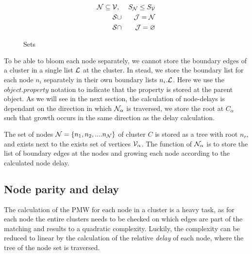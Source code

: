 \begin{eqnarray}\label{eq:upperboundsize}
  \mathcal{N} \subseteq \mathcal{V} &,& S_{\mathcal{N}} \leq S_{\mathcal{V}}  \\
  \nonumber \mathcal{S} &\cup& \mathcal{J} = \mathcal{N} \\
  \nonumber \mathcal{S} &\cap& \mathcal{J} = \varnothing
\end{eqnarray}


\begin{figure}
  \centering
  \caption{Sets}\label{fig:sets}
\end{figure}


To be able to bloom each node separately, we cannot store the boundary edges of a cluster in a single list $\mathcal{L}$ at the cluster. In stead, we store the boundary list for each node $n_i$ separately in their own boundary lists $n_i.\mathcal{L}$. Here we use the $object.property$ notation to indicate that the property is stored at the parent object. As we will see in the next section, the calculation of node-delays is dependant on the direction in which $\mathcal{N}_\alpha$ is traversed, we store the root at $C_\alpha$ such that growth occurs in the same direction as the delay calculation.

\begin{theorem}
  The set of nodes $\mathcal{N} = \{n_1, n_2, .... n_{\mathcal{N}}\}$ of cluster $C$ is stored as a tree with root $n_r$, and exists next to the exists set of vertices $\mathcal{V}_\alpha$. The function of $\mathcal{N}_\alpha$ is to store the list of boundary edges at the nodes and growing each node according to the calculated node delay.
\end{theorem}


\subsection{Node parity and delay}\label{sec:nodedelay}

The calculation of the PMW for each node in a cluster is a heavy task, as for each node the entire clusters needs to be checked on which edges are part of the matching and results to a quadratic complexity. Luckily, the complexity can be reduced to linear by the calculation of the relative \emph{delay} of each node, where the tree of the node set is traversed.

